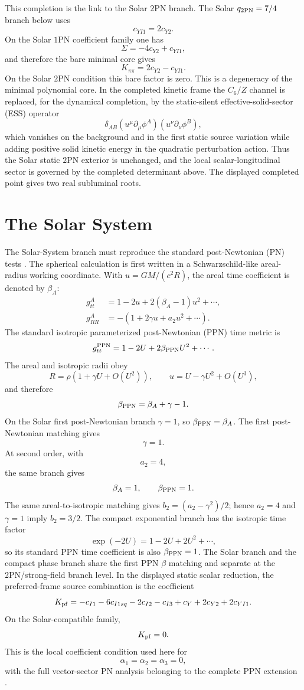 \documentclass[12pt,a4paper]{article}
\begin{document}
This completion is the link to the Solar $2$PN branch. The Solar
$q_{2{\rm PN}}=7/4$ branch below uses
\[
c_{YI1}=2c_{Y2}.
\]
On the Solar $1$PN coefficient family one has
\[
\Sigma=-4c_{Y2}+c_{YI1},
\]
and therefore the bare minimal core gives
\[
K_{\pi\pi}=2c_{Y2}-c_{YI1}.
\]
On the Solar $2$PN condition this bare factor is zero. This is a degeneracy of
the minimal polynomial core. In the completed kinetic frame the $C_6/Z$
channel is replaced, for the dynamical completion, by the static-silent
effective-solid-sector (ESS) operator
\[
\delta_{AB}(u^\mu\partial_\mu\phi^A)(u^\nu\partial_\nu\phi^B),
\]
which vanishes on the background and in the first static source variation while
adding positive solid kinetic energy in the quadratic perturbation action. Thus
the Solar static $2$PN exterior is unchanged, and the local scalar-longitudinal
sector is governed by the completed determinant above.  The displayed completed
point gives two real subluminal roots.

\section{The Solar System}

The Solar-System branch must reproduce the standard post-Newtonian (PN) tests \cite{Will1993,Will2014,Bertotti2003}. The spherical calculation is first written in a Schwarzschild-like areal-radius working coordinate. With $u=GM/(c^2R)$, the areal time coefficient is denoted by $\beta_A$:
\begin{align*}
g_{tt}^{A}&=1-2u+2(\beta_A-1)u^2+\cdots,\\
g_{RR}^{A}&=-(1+2\gamma u+a_2u^2+\cdots).
\end{align*}
The standard isotropic parameterized post-Newtonian (PPN) time metric is
\[
g_{tt}^{\rm PPN}=1-2U+2\beta_{\rm PPN}U^2+\cdots.
\]
The areal and isotropic radii obey
\[
R=\rho(1+\gamma U+O(U^2)),\qquad
u=U-\gamma U^2+O(U^3),
\]
and therefore
\[
\beta_{\rm PPN}=\beta_A+\gamma-1.
\]
On the Solar first post-Newtonian branch $\gamma=1$, so $\beta_{\rm PPN}=\beta_A$. The first post-Newtonian matching gives
\[
\gamma=1.
\]
At second order, with
\[
a_2=4,
\]
the same branch gives
\[
\beta_A=1,
\qquad
\beta_{\rm PPN}=1.
\]
The same areal-to-isotropic matching gives $b_2=(a_2-\gamma^2)/2$; hence
$a_2=4$ and $\gamma=1$ imply $b_2=3/2$.
The compact exponential branch has the isotropic time factor
\[
\exp(-2U)=1-2U+2U^2+\cdots,
\]
so its standard PPN time coefficient is also $\beta_{\rm PPN}=1$. The Solar branch and the compact phase branch share the first PPN $\beta$ matching and separate at the 2PN/strong-field branch level.
In the displayed static scalar reduction, the preferred-frame source
combination is the coefficient
\[
K_{\rm pf}
=-c_{I1}-6c_{I1sq}-2c_{I2}-c_{I3}
+c_Y+2c_{Y2}+2c_{YI1}.
\]
On the Solar-compatible family,
\[
K_{\rm pf}=0.
\]
This is the local coefficient condition used here for
\[
\alpha_1=\alpha_2=\alpha_3=0,
\]
with the full vector-sector PN analysis belonging to the complete PPN extension
\cite{WillNordtvedt1972,Kostelecky2022}.
\end{document}

